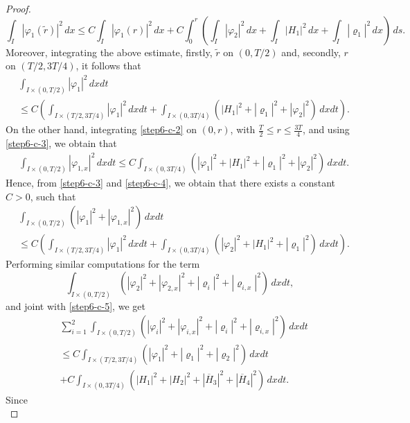 \documentclass[11pt,a4paper]{amsart}
\numberwithin{equation}{section}
\begin{document}
\begin{proof}
\begin{equation*}
    \int_{I}|\varphi_{1}(\tilde{r})|^{2}\,dx \leq C\int_{I}|\varphi_{1}(r)|^{2}\,dx+ C\int_{0}^{r}\left(\int_{I}|\varphi_{2}|^{2}\,dx+\int_{I}|H_1|^{2}\,dx+\int_{I}|\varrho_{1}|^{2}\,dx   \right)\,ds.
\end{equation*}Moreover, integrating the above estimate, firstly, $\tilde{r}$  on  $(0,T/2)$ and, secondly,  $r$  on  $(T/2,3T/4)$, it follows that 
\begin{align}\label{step6-c-3}
    & \int_{I\times(0,T/2)}|\varphi_{1}|^{2}\,dxdt\\
    &	 \leq  C\left(\int_{I\times(T/2,3T/4)}|\varphi_{1}|^{2}\,dxdt+\int_{I\times(0,3T/4)}(|H_1|^{2}+|\varrho_1|^{2}+|\varphi_2|^{2})\,dxdt \right).\nonumber
\end{align}On the other hand, integrating  \eqref{step6-c-2} on  $(0,r)$,  with  $\frac{T}{2}\leq r \leq   \frac{3T}{4}$,  and  using  \eqref{step6-c-3}, we obtain that
\begin{align}\label{step6-c-4}
&\int_{I\times(0,T/2)}|\varphi_{1,x}|^{2}\,dxdt	\leq C \int_{I\times(0,3T/4)}(|\varphi_1|^{2}+|H_1|^{2}+|\varrho_1|^{2}+|\varphi_2|^{2})\,dxdt.
\end{align}Hence, from \eqref{step6-c-3} and \eqref{step6-c-4}, we obtain that there exists a constant $C>0$, such that
\begin{align}\label{step6-c-5}
 & \int_{I\times(0,T/2)}(|\varphi_{1}|^{2}+|\varphi_{1,x}|^{2})\,dxdt	\\
  &\leq  C\left(\int_{I\times(T/2,3T/4)}|\varphi_{1}|^{2}\,dxdt+\int_{I\times(0,3T/4)}(|\varphi_{2}|^{2}+|H_1|^{2}+|\varrho_{1}|^{2})\,dxdt \right).\nonumber  
\end{align}Performing similar computations for the term 
$$
\int_{I\times(0,T/2)}(|\varphi_{2}|^{2}+|\varphi_{2,x}|^{2}+|\varrho_{i}|^{2}+|\varrho_{i,x}|^{2} )\,dxdt,
$$and joint with \eqref{step6-c-5}, we get
\begin{equation}\label{aux_23aunaun}
\begin{split}
&  \sum_{i=1}^{2}\int_{I\times(0,T/2)}(|\varphi_{i}|^{2}+|\varphi_{i,x}|^{2}+|\varrho_{i}|^{2}+|\varrho_{i,x}|^{2})\,dxdt\\
&\leq C\int_{I\times(T/2,3T/4)}(|\varphi_1|^{2}+|\varrho_{1}|^{2}+|\varrho_2|^{2})\,dxdt\\
&+ C\int_{I\times(0,3T/4)}(|H_1|^{2}+|H_{2}|^{2}+|\overline{H}_{3}|^{2}+|\overline{H}_{4}|^{2} )\,dxdt.
\end{split}
\end{equation}Since
\begin{equation}\label{new_limi_rhos}

\end{equation}
\end{proof}
\end{document}
